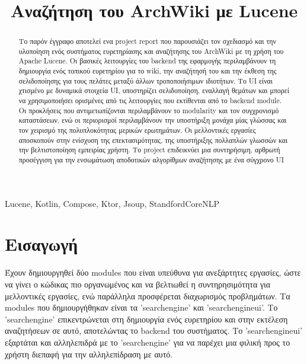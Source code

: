 \documentclass[conference]{IEEEtran}
\begin{document}
    \title{Αναζήτηση του ArchWiki με Lucene}

    \author{
    }

    \maketitle

    \begin{abstract}
        Το παρόν έγγραφο αποτελεί ενα project report που παρουσιάζει τον σχεδιασμό και την υλοποίηση ενός συστήματος ευρετηρίασης και αναζήτησης του ArchWiki με τη χρήση του Apache Lucene.
        Οι βασικές λειτουργίες του backend της εφαρμογής περιλαμβάνουν τη δημιουργία ενός τοπικού ευρετηρίου για το wiki, την αναζήτησή του και την έκθεση της σελιδοποίησης για τους πελάτες μεταξύ άλλων τροποποιήσιμων ιδιοτήτων.
        Το UI είναι χτισμένο με δυναμικά στοιχεία UI, υποστηρίζει σελιδοποίηση, εναλλαγή θεμάτων και μπορεί να χρησιμοποιήσει ορισμένες από τις λειτουργίες που εκτίθενται από το backend module.
        Οι προκλήσεις που αντιμετωπίζονται περιλαμβάνουν το modularity και τον συγχρονισμό καταστάσεων, ενώ οι περιορισμοί περιλαμβάνουν την υποστήριξη μονάχα μίας γλώσσας και τον χειρισμό της πολυπλοκότητας μερικών ερωτημάτων.
        Οι μελλοντικές εργασίες αποσκοπούν στην ενίσχυση της επεκτασιμότητας, της υποστήριξης πολλαπλών γλωσσών και την βελτιστοποίηση εμπειρίας χρήστη.
        Το project επιδεικνύει μια συντηρήσιμη, αρθρωτή προσέγγιση για την ενσωμάτωση αποδοτικών αλγορίθμων αναζήτησης με ένα σύγχρονο UI
    \end{abstract}

    \begin{IEEEkeywords}
        Lucene, Kotlin, Compose, Ktor, Jsoup, StandfordCoreNLP
    \end{IEEEkeywords}

    \section{Εισαγωγή}{
        Έχουν δημιουργηθεί δύο modules που είναι υπεύθυνα για ανεξάρτητες εργασίες, ώστε να γίνει ο κώδικας πιο οργανωμένος και να βελτιωθεί η συντηρησιμότητα για μελλοντικές εργασίες, ενώ παράλληλα προσφέρεται διαχωρισμός προβλημάτων.
        Τα modules που δημιουργήθηκαν είναι τα 'searchengine' και 'searchengineui'.
        Το 'searchengine' επικεντρώνεται στη δημιουργία ενός ευρετηρίου και στην εκτέλεση αναζητήσεων σε αυτό, αποτελώντας το backend του συστήματος.
        Το 'searchengineui' εξαρτάται και αλληλεπιδρά με το 'searchengine' για να παρέχει μια φιλική προς το χρήστη διεπαφή για την αλληλεπίδραση με αυτό.}\label{sec:intro}
\end{document}
